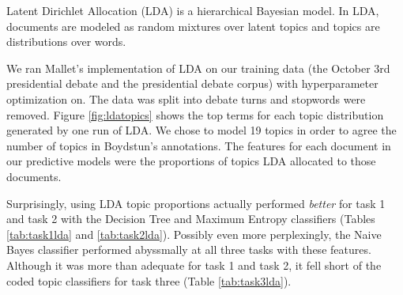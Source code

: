 
Latent Dirichlet Allocation (LDA) is a hierarchical Bayesian model.
In LDA, documents are modeled as random mixtures over latent topics and topics are distributions over words.

We ran Mallet's implementation of LDA on our training data (the October 3rd presidential debate and the presidential debate corpus) with hyperparameter optimization on.
The data was split into debate turns and stopwords were removed.
Figure \ref{fig:ldatopics} shows the top terms for each topic distribution generated by one run of LDA.
We chose to model 19 topics in order to agree the number of topics in Boydstun's annotations.
The features for each document in our predictive models were the proportions of topics LDA allocated to those documents.

Surprisingly, using LDA topic proportions actually performed \textit{better} for task 1 and task 2 with the Decision Tree and Maximum Entropy classifiers (Tables \ref{tab:task1lda} and \ref{tab:task2lda}).
Possibly even more perplexingly, the Naive Bayes classifier performed abyssmally at all three tasks with these features.
Although it was more than adequate for task 1 and task 2, it fell short of the coded topic classifiers for task three (Table \ref{tab:task3lda}).


